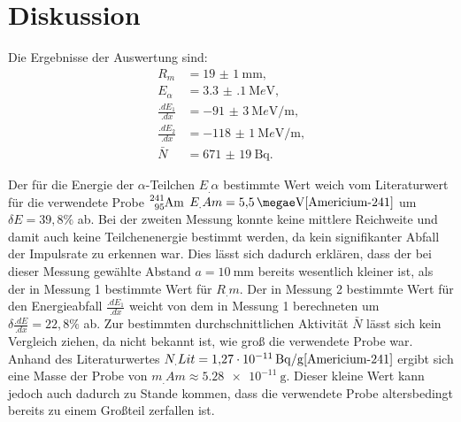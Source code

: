 
\section{Diskussion}
\label{sec:Diskussion}

Die Ergebnisse der Auswertung sind:
\begin{align*}
R_m			&= \SI{19(1)}{\milli\metre}\text{,}\\
E_\alpha 	&= \SI{3.3(1)}{\mega e\volt}\text{,}\\
\frac{.dE_1}{.dx}	&= \SI{-91(3)}{\mega e\volt\per\metre}\text{,}\\
\frac{.dE_2}{.dx}	&= \SI{-118(1)}{\mega e\volt\per\metre}\text{,}\\
\bar{N}		&= \SI{671(19)}{\becquerel} \text{.}
\end{align*}

Der für die Energie der $\alpha$-Teilchen $E_.{\alpha}$ bestimmte Wert weich vom Literaturwert für die verwendete Probe $\ce{^{241}_{95}Am}$
$E_.{Am}=\SI{5.5}{\megae\volt}\cite{Americium-241}$ um $\delta E = 39,8 \%$ ab.
Bei der zweiten Messung konnte keine mittlere Reichweite und damit auch keine Teilchenenergie bestimmt werden, da kein signifikanter Abfall der Impulsrate zu erkennen war. Dies lässt sich dadurch erklären, dass der bei dieser Messung gewählte Abstand $a=\SI{10}{\milli\metre}$ bereits wesentlich kleiner ist, als der in Messung 1 bestimmte Wert für $R_.m$.
Der in Messung 2 bestimmte Wert für den Energieabfall $\frac{.dE_1}{.dx}$ weicht von dem in Messung 1 berechneten um $\delta \frac{.dE}{.dx}= 22,8\%$ ab.
Zur bestimmten durchschnittlichen Aktivität $\bar{N}$ lässt sich kein Vergleich ziehen, da nicht bekannt ist, wie groß die verwendete Probe war.
Anhand des Literaturwertes $N_.{Lit}=\SI{1,27e-11}{\becquerel\per\gram}\cite{Americium-241}$ ergibt sich eine Masse der Probe von $m_.{Am}\approx \SI{5,28e-11}{\gram}$. Dieser kleine Wert kann jedoch auch dadurch zu Stande kommen, dass die verwendete Probe altersbedingt bereits zu einem Großteil zerfallen ist.